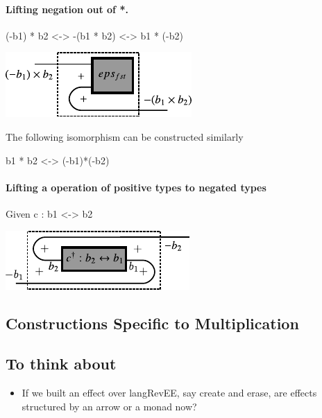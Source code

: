 \documentclass[preprint]{sigplanconf}
\begin{document}
{\paragraph*{Lifting negation out of {{*}}. }

{{(-b1) * b2 <-> -(b1 * b2) <-> b1 * (-b2)}}

\begin{center}
  \includegraphics{diagrams/mult_neg.pdf}
\end{center}

The following isomorphism can be constructed similarly 

{{b1 * b2 <-> (-b1)*(-b2)}}


\paragraph*{Lifting a operation of positive types to negated types}

Given {{c : b1 <-> b2}}

\begin{center}
  \includegraphics{diagrams/neg_lift.pdf}
\end{center}


\subsection{Constructions Specific to Multiplication}


\subsection{To think about}

\begin{itemize}

\item If we built an effect over {{langRevEE}}, say {{create}} and
  {{erase}}, are effects structured by an arrow or a monad now?


\end{itemize}}
\end{document}

